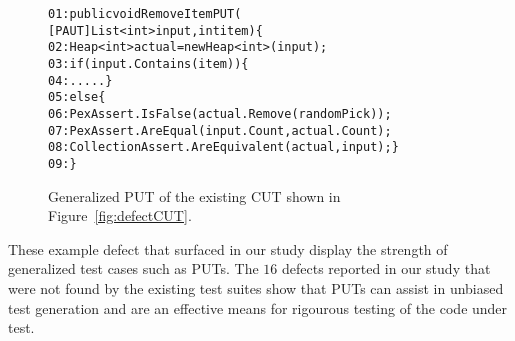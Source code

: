 \begin{figure}[t]
\begin{CodeOut}
\begin{alltt}
01: public void RemoveItemPUT(
\hspace*{0.7in} [PAUT]List<int> input, int item) \{
02: \hspace*{0.07in}Heap<int> actual = new Heap<int> (input);
03: \hspace*{0.07in}if (input.Contains(item)) \{
04: \hspace*{0.2in}..... \}
05: \hspace*{0.07in}else \{
06: \hspace*{0.2in}PexAssert.IsFalse(actual.Remove(randomPick));
07: \hspace*{0.2in}PexAssert.AreEqual(input.Count, actual.Count);
08: \hspace*{0.2in}CollectionAssert.AreEquivalent(actual, input);\}
09: \hspace*{0.02in}\}
\end{alltt}
\end{CodeOut}
\caption{Generalized PUT of the existing CUT shown in Figure~\ref{fig:defectCUT}.}
\label{fig:defectPUT} 
\end{figure}

These example defect that surfaced in our study display the strength of generalized test cases such as PUTs. The $16$ defects reported in our study that were not found by the existing test suites show that PUTs can assist in unbiased test generation and are an effective means for rigourous testing of the code under test.  
%
%
